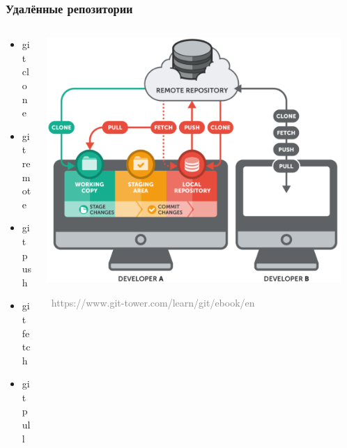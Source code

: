 \documentclass[xetex,mathserif,serif]{beamer}
\newcommand{\attribution}[1] {
	\vspace{-5mm}\begin{flushright}\begin{scriptsize}\textcolor{gray}{\textcopyright\, #1}\end{scriptsize}\end{flushright}
}
\begin{document}
	\begin{frame}
		\frametitle{Удалённые репозитории}
		\begin{columns}
			\begin{column}{0.4\textwidth}
				\begin{itemize}
					\item git clone
					\item git remote
					\item git push
					\item git fetch
					\item git pull
				\end{itemize}
			\end{column}
			\begin{column}{0.6\textwidth}
				\begin{center}
					\includegraphics[width=0.95\textwidth]{remoteRepos.png}
					\attribution{https://www.git-tower.com/learn/git/ebook/en}
				\end{center}
			\end{column}
		\end{columns}
	\end{frame}
\end{document}
